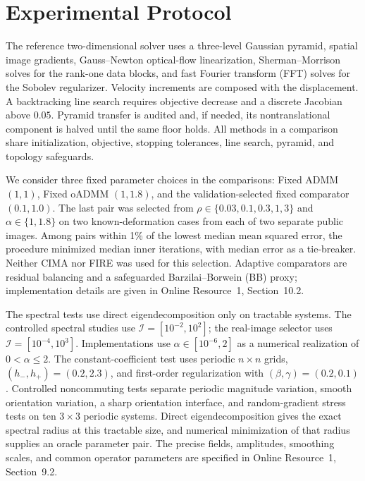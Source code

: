 \documentclass[pdflatex,iicol,sn-mathphys-num]{sn-jnl}
\theoremstyle{definition}
\begin{document}
\section{Experimental Protocol}\label{sec:protocol}
The reference two-dimensional solver uses a three-level Gaussian pyramid,
spatial image gradients, Gauss--Newton optical-flow linearization,
Sherman--Morrison solves for the rank-one data blocks, and fast Fourier
transform (FFT) solves for the Sobolev regularizer. Velocity increments are
composed with the displacement. A
backtracking line search requires objective decrease and a discrete Jacobian
above $0.05$. Pyramid transfer is audited and, if needed, its
nontranslational component is halved until the same floor holds. All methods in
a comparison share initialization, objective, stopping tolerances, line search,
pyramid, and topology safeguards.

We consider three fixed parameter choices in the comparisons:
Fixed ADMM $(1, 1)$, Fixed oADMM $(1, 1.8)$, and the validation-selected fixed
comparator $(0.1, 1.0)$. The last pair was selected from
$\rho\in\{0.03,0.1,0.3,1,3\}$ and $\alpha\in\{1,1.8\}$ on two known-deformation
cases from each of two separate public images. Among pairs within 1\% of the
lowest median mean squared error, the procedure minimized median inner
iterations, with median error as a tie-breaker. Neither CIMA nor FIRE was used
for this selection. Adaptive comparators are residual balancing and a
safeguarded Barzilai--Borwein (BB) proxy; implementation details are given in
Online Resource~1, Section~10.2.

The spectral tests use direct eigendecomposition only on tractable systems.
The controlled spectral studies use
$\mathcal I=[10^{-2},10^2]$; the real-image selector uses
$\mathcal I=[10^{-4},10^3]$. Implementations use
$\alpha\in[10^{-6},2]$ as a numerical realization of $0<\alpha\le2$.
The constant-coefficient test uses periodic $n\times n$ grids,
$(h_-,h_+)=(0.2,2.3)$, and first-order regularization with
$(\beta,\gamma)=(0.2,0.1)$. Controlled noncommuting tests separate periodic
magnitude variation, smooth orientation variation, a sharp orientation
interface, and random-gradient stress tests on ten $3\times3$ periodic systems.
Direct eigendecomposition gives the exact spectral radius at this tractable
size, and numerical minimization of that radius supplies an oracle parameter
pair. The precise fields, amplitudes, smoothing scales, and common operator
parameters are specified in Online Resource~1, Section~9.2.
\end{document}
